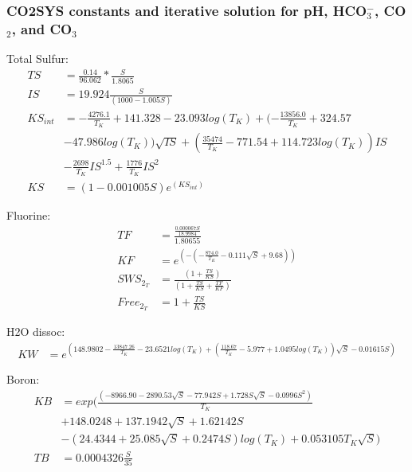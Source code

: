 \documentclass{ruthesis}
\begin{document}


\subsubsection{CO2SYS constants and iterative solution for pH, HCO$_3^-$, CO$_2$, and CO$_3$}

Total Sulfur:
\begin{align*}
TS     	&= \frac{0.14}{96.062} * \frac{S}{1.8065} \nonumber \\
IS     	&= 19.924 \frac{S}{(1000 - 1.005 S)} \nonumber \\
KS_{int} 	&= -\frac{4276.1}{T_K} + 141.328 - 23.093 log(T_K) + (-\frac{13856.0}{T_K} + 324.57 \nonumber\\ 			 
& - 47.986 log(T_K)) \sqrt{IS} + ( \frac{35474}{T_K} - 771.54  + 114.723 log(T_K)) IS \nonumber \\
& - \frac{2698}{T_K} IS^{1.5} + \frac{1776}{T_K} IS^2 \nonumber \\
KS     	&=  (1 - 0.001005 S)e^{(KS_{int})} \nonumber 
\end{align*}

Fluorine:
\begin{align*}
TF       		&= \frac{\frac{0.000067 S}{18.9984}}{1.80655} \nonumber \\
KF       		&= e^{(-(-\frac{874.0}{T_K} - 0.111 \sqrt{S} + 9.68))} \nonumber \\
SWS_{2_T}  	&= \frac{(1 + \frac{TS}{KS})}{(1 + \frac{TS}{KS} + \frac{TF}{KF})} \nonumber \\
Free_{2_T} 	&= 1 + \frac{TS}{KS} \nonumber 
\end{align*}

H2O dissoc:
\begin{align*}
KW 		&= e^{(148.9802 - \frac{13847.26}{T_K}  - 23.6521 log(T_K) 
+ (\frac{118.67}{T_K} - 5.977 + 1.0495 log(T_K)) \sqrt{S} - 0.01615 S)} \nonumber 
\end{align*}

Boron:
\begin{align*}
KB 		&= exp(\frac{(-8966.90 - 2890.53 \sqrt{S} - 77.942 S + 1.728 S \sqrt{S} - 0.0996 S^2)}{T_K} \\
&+ 148.0248 + 137.1942 \sqrt{S} + 1.62142 S \\
&- (24.4344 + 25.085 \sqrt{S} + 0.2474 S) log(T_K) + 0.053105 T_K \sqrt{S}) \nonumber \\
TB 		&= 0.0004326 \frac{S}{35} \nonumber 
\end{align*}
\end{document}
